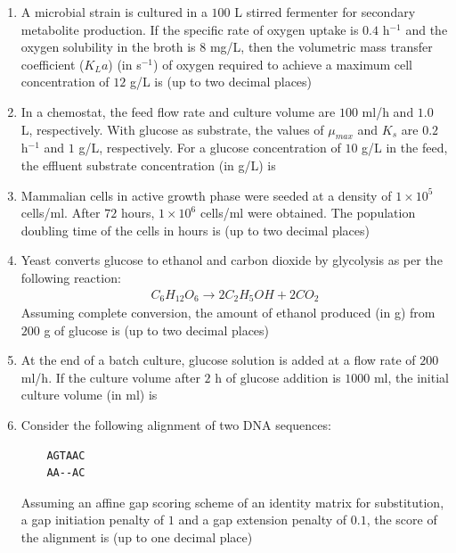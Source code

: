 \documentclass[journal,12pt,onecolumn]{IEEEtran}
\theoremstyle{remark}
\begin{document}
\begin{enumerate}
    \item A microbial strain is cultured in a $100$ L stirred fermenter for secondary metabolite production. If the specific rate of oxygen uptake is $0.4$ h$^{-1}$ and the oxygen solubility in the broth is $8$ mg/L, then the volumetric mass transfer coefficient ($K_L a$) (in s$^{-1}$) of oxygen required to achieve a maximum cell concentration of $12$ g/L is (up to two decimal places) \underline{\hspace{2cm}}
    
    \item In a chemostat, the feed flow rate and culture volume are $100$ ml/h and $1.0$ L, respectively. With glucose as substrate, the values of $\mu_{max}$ and $K_s$ are $0.2$ h$^{-1}$ and $1$ g/L, respectively. For a glucose concentration of $10$ g/L in the feed, the effluent substrate concentration (in g/L) is \underline{\hspace{2cm}}
    
    \item Mammalian cells in active growth phase were seeded at a density of $1 \times 10^5$ cells/ml. After $72$ hours, $1 \times 10^6$ cells/ml were obtained. The population doubling time of the cells in hours is (up to two decimal places) \underline{\hspace{2cm}}
    
    \item Yeast converts glucose to ethanol and carbon dioxide by glycolysis as per the following reaction:
    \begin{align*}
        {C_6H_{12}O_6} \rightarrow 2{C_2H_5OH} + 2{CO_2}
     \end{align*}
    Assuming complete conversion, the amount of ethanol produced (in g) from $200$ g of glucose is (up to two decimal places) \underline{\hspace{2cm}}
    \item At the end of a batch culture, glucose solution is added at a flow rate of $200$ ml/h. If the culture volume after $2$ h of glucose addition is $1000$ ml, the initial culture volume (in ml) is \underline{\hspace{2cm}}
    
    \item Consider the following alignment of two DNA sequences:
    \begin{verbatim}
    AGTAAC
    AA--AC
    \end{verbatim}
    Assuming an affine gap scoring scheme of an identity matrix for substitution, a gap initiation penalty of $1$ and a gap extension penalty of $0.1$, the score of the alignment is (up to one decimal place) \underline{\hspace{2cm}}
    

\end{enumerate}
\end{document}
